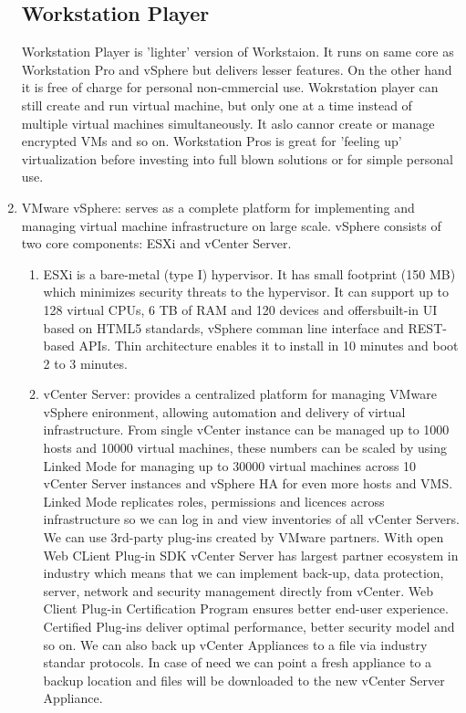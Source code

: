 \begin{enumerate}
\subsection{Workstation Player}
Workstation Player is 'lighter' version of Workstaion. It runs on same core as Workstation Pro and vSphere but delivers lesser features. On the other hand it is free of charge for personal non-cmmercial use. Wokrstation player can still create and run virtual machine, but only one at a time instead of multiple virtual machines simultaneously. It aslo cannor create or manage encrypted VMs and so on. Workstation Pros is great for 'feeling up' virtualization before investing into full blown solutions or for simple personal use.
\item VMware vSphere: serves as a complete platform for implementing and managing virtual machine infrastructure on large scale. vSphere consists of two core components: ESXi and vCenter Server.
\begin{enumerate}
\item ESXi is a bare-metal (type I) hypervisor. It has small footprint (150 MB) which minimizes security threats to the hypervisor. It can support up to 128 virtual CPUs, 6 TB of RAM and 120 devices and offersbuilt-in UI based on HTML5 standards, vSphere comman line interface and REST-based APIs. Thin architecture enables it to install in 10 minutes and boot 2 to 3 minutes.
\item vCenter Server: provides a centralized platform for managing VMware vSphere enironment, allowing automation and delivery of virtual infrastructure. From single vCenter instance can be managed up to 1000 hosts and 10000 virtual machines, these numbers can be scaled by using Linked Mode for managing up to 30000 virtual machines across 10 vCenter Server instances and vSphere HA for even more hosts and VMS. Linked Mode replicates roles, permissions and licences across infrastructure so we can log in and view inventories of all vCenter Servers. We can use 3rd-party plug-ins created by VMware partners. With open Web CLient Plug-in SDK vCenter Server has largest partner ecosystem in industry which means that we can implement back-up, data protection, server, network and security management directly from vCenter. Web Client Plug-in Certification Program ensures better end-user experience. Certified Plug-ins deliver optimal performance, better security model and so on. We can also back up vCenter Appliances to a file via industry standar protocols. In case of need we can point a fresh appliance to a backup location and files will be downloaded to the new vCenter Server Appliance.
\end{enumerate}

\end{enumerate}
